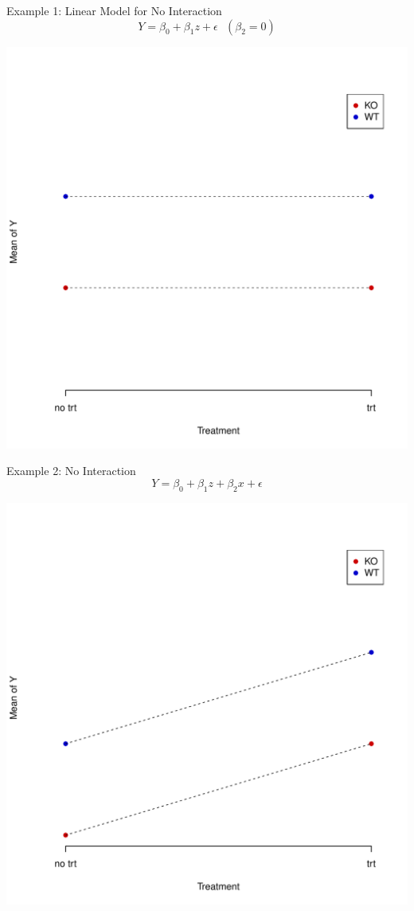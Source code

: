 \documentclass[xcolor=x11names,compress]{beamer}\usepackage[]{graphicx}\usepackage[]{color}
\newenvironment{knitrout}{}{} %
\begin{document}
\begin{frame}{Example 1: Linear Model for No Interaction}
  \begin{equation*}
    Y=\beta_0 + \beta_1 z + \epsilon \mbox{ $(\beta_2=0)$}
  \end{equation*}
\begin{knitrout}\tiny
{}\color{fgcolor}

{\centering \includegraphics[width=.6\linewidth]{figure/beamer-unnamed-chunk-92-1} 

}



\end{knitrout}
\end{frame}


\begin{frame}{Example 2: No Interaction}
   \begin{equation*}
    Y=\beta_0 + \beta_1 z + \beta_2 x + \epsilon
  \end{equation*}
  
\begin{knitrout}\tiny
{}\color{fgcolor}

{\centering \includegraphics[width=.6\linewidth]{figure/beamer-unnamed-chunk-93-1} 

}



\end{knitrout}
\end{frame}
\end{document}
